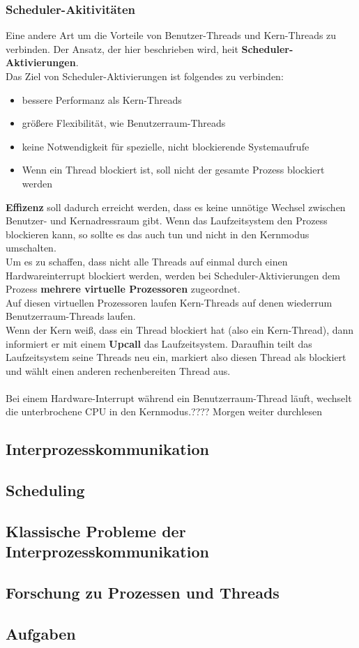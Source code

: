 \documentclass[12pt,a4paper]{univention}
\begin{document}
\subsubsection{Scheduler-Akitivitäten}
Eine andere Art um die Vorteile von Benutzer-Threads und Kern-Threads zu verbinden. Der Ansatz, der hier beschrieben wird, heit \textbf{Scheduler-Aktivierungen}.\\
Das Ziel von Scheduler-Aktivierungen ist folgendes zu verbinden: 
\begin{itemize}
\item{bessere Performanz als Kern-Threads}
\item{größere Flexibilität, wie Benutzerraum-Threads}
\item{keine Notwendigkeit für spezielle, nicht blockierende Systemaufrufe}
\item{Wenn ein Thread blockiert ist, soll nicht der gesamte Prozess blockiert werden}
\end{itemize}
\textbf{Effizenz} soll dadurch erreicht werden, dass es keine unnötige Wechsel zwischen Benutzer- und Kernadressraum gibt. Wenn das Laufzeitsystem den Prozess blockieren kann, so sollte es das auch tun und nicht in den Kernmodus umschalten.\\
Um es zu schaffen, dass nicht alle Threads auf einmal durch einen Hardwareinterrupt blockiert werden, werden bei Scheduler-Aktivierungen dem Prozess \textbf{mehrere virtuelle Prozessoren} zugeordnet.\\
Auf diesen virtuellen Prozessoren laufen Kern-Threads auf denen wiederrum Benutzerraum-Threads laufen.\\
Wenn der Kern weiß, dass ein Thread blockiert hat (also ein Kern-Thread), dann informiert er mit einem \textbf{Upcall} das Laufzeitsystem. Daraufhin teilt das Laufzeitsystem seine Threads neu ein, markiert also diesen Thread als blockiert und wählt einen anderen rechenbereiten Thread aus.\\\\
Bei einem Hardware-Interrupt während ein Benutzerraum-Thread läuft, wechselt die unterbrochene CPU in den Kernmodus.???? Morgen weiter durchlesen

\subsection{Interprozesskommunikation}
\subsection{Scheduling}
\subsection{Klassische Probleme der Interprozesskommunikation}
\subsection{Forschung zu Prozessen und Threads}
\subsection{Aufgaben}
\end{document}
